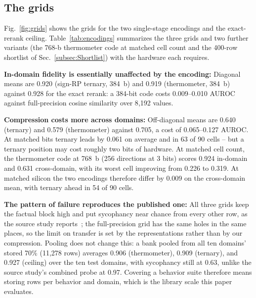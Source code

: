 \documentclass[conference]{IEEEtran}
\newcommand{\auroc}{{AUROC}\xspace}
\newcommand{\signrp}{{sign-RP}\xspace}
\begin{document}
\subsection{The grids}
\label{subsec:Grids}
Fig.~\ref{fig:grids} shows the grids for the two single-stage
encodings and the exact-rerank ceiling. Table~\ref{tab:encodings}
summarizes the three grids and two further variants (the 768-b
thermometer code at matched cell count and the 400-row shortlist of
Sec.~\ref{subsec:Shortlist}) with the hardware each requires.

\textbf{In-domain fidelity is essentially unaffected by the
encoding:} Diagonal means are 0.920 (\signrp ternary, 384~b) and
0.919 (thermometer, 384~b) against 0.928 for the exact rerank: a
384-bit code costs 0.009--0.010 \auroc against full-precision cosine
similarity over 8{,}192 values.

\textbf{Compression costs more across domains:}
Off-diagonal means are 0.640 (ternary) and 0.579 (thermometer)
against 0.705, a cost of 0.065--0.127 \auroc. At matched bits ternary
leads by 0.061 on average and in 63 of 90 cells -- but a ternary
position may cost roughly two bits of hardware. At matched cell
count, the thermometer code at 768~b (256 directions at 3 bits)
scores 0.924 in-domain and 0.631 cross-domain, with its worst cell
improving from 0.226 to 0.319. At matched silicon the two encodings
therefore differ by 0.009 on the cross-domain mean, with ternary
ahead in 54 of 90 cells.

\textbf{The pattern of failure reproduces the published one:} All
three grids keep the factual block high and put sycophancy near
chance from every other row, as the source study
reports~\cite{ying2026spectrum}; the full-precision grid has the
same holes in the same places, so the limit on transfer is set by
the representations rather than by our compression. Pooling does not
change this: a bank pooled from all ten domains' stored 70\%
(11{,}278 rows) averages 0.906 (thermometer), 0.909
(ternary), and 0.927 (ceiling) over the ten test domains, with
sycophancy still at 0.63, unlike the source study's combined probe at
0.97. Covering a behavior suite therefore means storing rows per
behavior and domain, which is the library scale this paper
evaluates.
\end{document}
